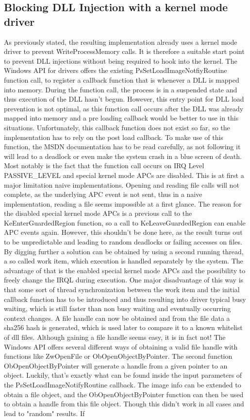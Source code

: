\subsection{Blocking DLL Injection with a kernel mode driver}
As previously stated, the resulting implementation already uses a kernel mode driver to prevent WriteProcessMemory calls. It is therefore a suitable start point to prevent DLL injections without being required to hook into the kernel. The Windows API for drivers offers the existing PsSetLoadImageNotfiyRoutine function call, to register a callback function that is whenever a DLL is mapped into memory. During the function call, the process is in a suspended state and thus execution of the DLL hasn't begun. However, this entry point for DLL load prevention is not optimal, as this function call occurs after the DLL was already mapped into memory and a pre loading callback would be better to use in this situations. Unfortunately, this callback function does not exist so far, so the implementation has to rely on the post load callback. To make use of this function, the MSDN documentation has to be read carefully, as not following it will lead to a deadlock or even make the system crash in a blue screen of death. Most notably is the fact that the function call occurs on IRQ Level PASSIVE\_LEVEL and special kernel mode APCs are disabled. This is at first a major limitation naive implementations. Opening and reading file calls will not complete, as the underlying APC event is not sent, thus in a naive implementation, reading a file seems impossible at a first glance. The reason for the disabled special kernel mode APCs is a previous call to the KeEnterGuardedRegion function, so a call to KeLeaveGuardedRegion can enable APC events again. However, this shouldn't be done here, as the result turns out to be unpredictable and leading to random deadlocks or failing accesses on files. By digging further a solution can be obtained by using a second running thread, a so called work item, which execution is handled separately by the system. The advantage of that is the enabled special kernel mode APCs and the possibility to freely change the IRQL during execution. One major disadvantage of this way is that some sort of thread synchronization between the work item and the initial callback function has to be introduced and thus resulting into driver typical busy waiting, which is still faster than non busy waiting and eventually occurring context changes. A file handle can now be obtained and from the file data a sha256 hash is generated, which is used later to compare it to a known whitelist of dll files. Although gaining a file handle seems easy, it is in fact not! The Windows API offers several different ways of obtaining a valid file handle with functions like ZwOpenFile or ObOpenObjectByPointer. The second function ObOpenObjectByPointer will generate a handle from a given pointer to an object. Luckily, that's exactly what can be found inside the input parameters of the PsSetLoadImageNotifyRoutine callback. The image info can be extended to obtain a file object, and the ObOpenObjectByPointer function can then be used to obtain a handle from this file object. Though this didn't work in all cases and lead to "random" results. If 